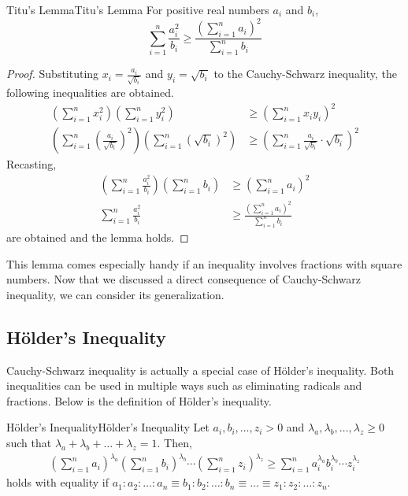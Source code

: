 \documentclass[../../main.tex]{subfiles}
\begin{document}
\begin{corollary}{Titu's Lemma}{Titu's Lemma}
For positive real numbers $a_i$ and $b_i$,
\[
\sum_{i=1}^n \frac{a_i^2}{b_i}
\geq
\frac{ \left( \sum_{i=1}^n a_i \right)^2 }{ \sum_{i=1}^n b_i }
\]
\end{corollary}
\begin{proof}
Substituting $x_i = \frac{a_i}{\sqrt{b_i}}$ and $y_i = \sqrt{b_i}$
to the Cauchy-Schwarz inequality, the following inequalities are
obtained.
\begin{align*}
    \left( \sum_{i=1}^n x_i^2 \right)
    \left( \sum_{i=1}^n y_i^2 \right)
    &\geq
    \left( \sum_{i=1}^n x_i y_i \right)^2 \\[0.5em]
    \left(
        \sum_{i=1}^n \left( \frac{a_i}{\sqrt{b_i}} \right)^2
    \right)
    \left(
        \sum_{i=1}^n \left( \sqrt{b_i} \right)^2
    \right)
    &\geq
    \left(
        \sum_{i=1}^n \frac{a_i}{\sqrt{b_i}} \cdot \sqrt{b_i}
    \right)^2
\end{align*}
Recasting,
\begin{align*}
    \left( \sum_{i=1}^n \frac{a_i^2}{b_i} \right)
        \left( \sum_{i=1}^n b_i \right)
    &\geq
    \left( \sum_{i=1}^n a_i \right)^2 \\
    \sum_{i=1}^n \frac{a_i^2}{b_i}
    &\geq
    \frac{ \left( \sum_{i=1}^n a_i \right)^2 }{ \sum_{i=1}^n b_i }
\end{align*}
are obtained and the lemma holds.
\end{proof}

This lemma comes especially handy if an inequality involves
fractions with square numbers. Now that we discussed a direct
consequence of Cauchy-Schwarz inequality, we can consider its
generalization.

\subsection{Hölder's Inequality}

Cauchy-Schwarz inequality is actually a special case of Hölder's
inequality. Both inequalities can be used in multiple ways such as
eliminating radicals and fractions. Below is the definition of
Hölder's inequality.

\begin{definition}{Hölder's Inequality}{Hölder's Inequality}
Let $a_i, b_i, \ldots, z_i > 0$ and $\lambda_a, \lambda_b, \ldots,
\lambda_z \geq 0$ such that $\lambda_a + \lambda_b + \dots +
\lambda_z = 1$. Then,
\begin{align*}
\left( \sum_{i=1}^n a_i \right)^{\lambda_a}
\left( \sum_{i=1}^n b_i \right)^{\lambda_b} \cdots
\left( \sum_{i=1}^n z_i \right)^{\lambda_z}
\geq
    \sum_{i=1}^n a_i^{\lambda_a} b_i^{\lambda_b}
        \cdots z_i^{\lambda_z}
\end{align*}
holds with equality if $a_1 : a_2 : \dots : a_n \equiv b_1 : b_2 :
\dots : b_n \equiv \dots \equiv z_1 : z_2 : \dots : z_n$.
\end{definition}
\end{document}
